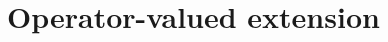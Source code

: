 \documentclass[final,12pt]{colt2026} %
\begin{document}







\appendix

\section{Operator-valued extension}
\label{app:operator-valued}
\end{document}
